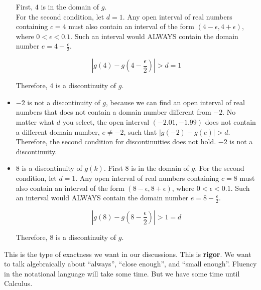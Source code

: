 \documentclass{ximera}
\begin{document}
\begin{example}
\begin{itemize}
First, $4$ is in the domain of $g$. \\


For the second condition, let $d = 1$. Any open interval of real numbers containing $c = 4$ must also contain an interval of the form $(4-\epsilon, 4+\epsilon)$, where $0 < \epsilon < 0.1$.  Such an interval would ALWAYS contain the domain number $e = 4-\frac{\epsilon}{2}$.

\[ \left| g(4) - g\left(4-\frac{\epsilon}{2}\right) \right| > d = 1 \]

Therefore, $4$ is a discontinuity of $g$. \\


\item $-2$ is not a discontinuity of $g$, because we can find an open interval of real numbers that does not contain a domain number different from $-2$.  No matter what $d$ you select, the open interval $(-2.01, -1.99)$ does not contain a different domain number, $e \ne -2$, such that $|g(-2) - g(e)| > d$.  Therefore, the second condition for discontinuities does not hold.  $-2$ is not a discontinuity. \\




\item $8$ is a discontinuity of $g(k)$.  First $8$ is in the domain of $g$. For the second condition, let $d = 1$. Any open interval of real numbers containing $c = 8$ must also contain an interval of the form $(8-\epsilon, 8+\epsilon)$, where $0 < \epsilon < 0.1$.   Such an interval would ALWAYS contain the domain number $e = 8-\frac{\epsilon}{2}$.

\[ \left| g(8) - g\left(8-\frac{\epsilon}{2}\right) \right| > 1 = d \]

Therefore, $8$ is a discontinuity of $g$.

\end{itemize}



\end{example}

This is the type of exactness we want in our discussions.  This is \textbf{\textcolor{purple!85!blue}{rigor}}. We want to talk algebraically about ``always'', ``close enough'', and ``small enough''.  Fluency in the notational language will take some time.  But we have some time until Calculus.
\end{document}

